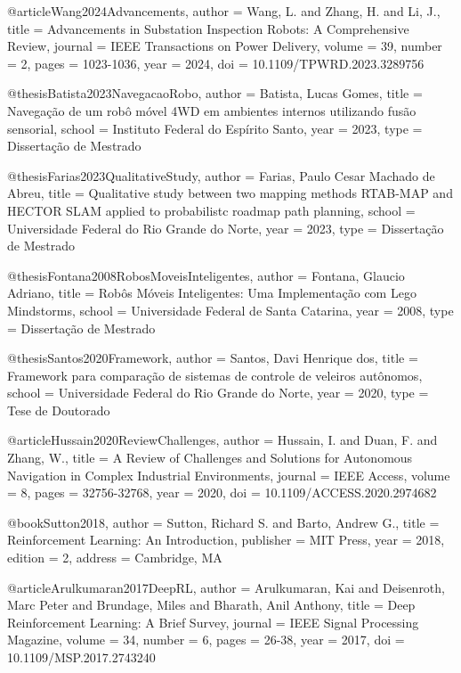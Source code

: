 @article{Wang2024Advancements,
  author = {Wang, L. and Zhang, H. and Li, J.},
  title = {Advancements in Substation Inspection Robots: A Comprehensive Review},
  journal = {IEEE Transactions on Power Delivery},
  volume = {39},
  number = {2},
  pages = {1023-1036},
  year = {2024},
  doi = {10.1109/TPWRD.2023.3289756}
}

@thesis{Batista2023NavegacaoRobo,
  author = {Batista, Lucas Gomes},
  title = {Navegação de um robô móvel 4WD em ambientes internos utilizando fusão sensorial},
  school = {Instituto Federal do Espírito Santo},
  year = {2023},
  type = {Dissertação de Mestrado}
}

@thesis{Farias2023QualitativeStudy,
  author = {Farias, Paulo Cesar Machado de Abreu},
  title = {Qualitative study between two mapping methods RTAB-MAP and HECTOR SLAM applied to probabilistc roadmap path planning},
  school = {Universidade Federal do Rio Grande do Norte},
  year = {2023},
  type = {Dissertação de Mestrado}
}

@thesis{Fontana2008RobosMoveisInteligentes,
  author = {Fontana, Glaucio Adriano},
  title = {Robôs Móveis Inteligentes: Uma Implementação com Lego Mindstorms},
  school = {Universidade Federal de Santa Catarina},
  year = {2008},
  type = {Dissertação de Mestrado}
}

@thesis{Santos2020Framework,
  author = {Santos, Davi Henrique dos},
  title = {Framework para comparação de sistemas de controle de veleiros autônomos},
  school = {Universidade Federal do Rio Grande do Norte},
  year = {2020},
  type = {Tese de Doutorado}
}

@article{Hussain2020ReviewChallenges,
  author = {Hussain, I. and Duan, F. and Zhang, W.},
  title = {A Review of Challenges and Solutions for Autonomous Navigation in Complex Industrial Environments},
  journal = {IEEE Access},
  volume = {8},
  pages = {32756-32768},
  year = {2020},
  doi = {10.1109/ACCESS.2020.2974682}
}

@book{Sutton2018,
  author = {Sutton, Richard S. and Barto, Andrew G.},
  title = {Reinforcement Learning: An Introduction},
  publisher = {MIT Press},
  year = {2018},
  edition = {2},
  address = {Cambridge, MA}
}

@article{Arulkumaran2017DeepRL,
  author = {Arulkumaran, Kai and Deisenroth, Marc Peter and Brundage, Miles and Bharath, Anil Anthony},
  title = {Deep Reinforcement Learning: A Brief Survey},
  journal = {IEEE Signal Processing Magazine},
  volume = {34},
  number = {6},
  pages = {26-38},
  year = {2017},
  doi = {10.1109/MSP.2017.2743240}
}

